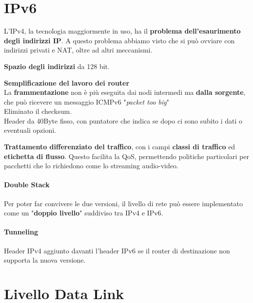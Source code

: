 \documentclass[10pt]{article}
\begin{document}
\section{IPv6}
L'IPv4, la tecnologia maggiormente in uso, ha il \textbf{problema dell'esaurimento degli indirizzi IP}. A questo problema abbiamo visto che si può ovviare con indirizzi privati e NAT, oltre ad altri meccanismi.\\
\begin{list}{}{\textbf{Cosa cambia} nell'IPv6:}
	\item \textbf{Spazio degli indirizzi} da 128 bit.
	\item \textbf{Semplificazione del lavoro dei router}\\
	La \textbf{frammentazione} non è più eseguita dai nodi intermedi ma \textbf{dalla sorgente}, che può ricevere un messaggio ICMPv6 "\textit{packet too big}"\\
	Eliminato il checksum.\\
	Header da 40Byte fisso, con puntatore che indica se dopo ci sono subito i dati o eventuali opzioni.
	\item \textbf{Trattamento differenziato del traffico}, con i campi \textbf{classi di traffico} ed \textbf{etichetta di flusso}. Questo facilita la QoS, permettendo politiche particolari per pacchetti che lo richiedono come lo streaming audio-video.
\end{list}
\paragraph{Double Stack} Per poter far convivere le due versioni, il livello di rete può essere implementato come un "\textbf{doppio livello}" suddiviso tra IPv4 e IPv6.
\paragraph{Tunneling} Header IPv4 aggiunto davanti l'header IPv6 se il router di destinazione non supporta la nuova versione.
\pagebreak
\section{Livello Data Link}
\end{document}

